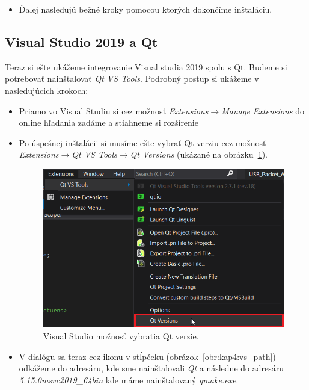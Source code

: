 \begin{itemize}
\item Ďalej nasledujú bežné kroky pomocou ktorých dokončíme inštaláciu.

\end{itemize}

\subsection{Visual Studio 2019 a Qt}
\label{kap4:sec:VS2019_qt}
Teraz si ešte ukážeme integrovanie Visual studia 2019 spolu s Qt. Budeme si potrebovať nainštalovať \textit{Qt VS Tools}. Podrobný postup si ukážeme v nasledujúcich krokoch:
\begin{itemize}
\label{kap4:qt_vs_integ}
\item Priamo vo Visual Studiu si cez možnosť \textit{Extensions}$\rightarrow$\textit{Manage Extensions} do online hľadania zadáme  a stiahneme si rozšírenie ~\cite{qt_vs_tools}
\item\label{kap4:qt_vs_integ:krok2} Po úspešnej inštalácii si musíme ešte vybrať Qt verziu cez možnosť \textit{Extensions}$\rightarrow$\textit{Qt VS Tools}$\rightarrow$\textit{Qt Versions} (ukázané na obrázku~\ref{obr:kap4:vs_versions}).

\begin{figure}[!htb]
	\centering
	\includegraphics[width=12cm]{img/kap04_vs_versions}
	\caption{Visual Studio možnosť vybratia Qt verzie.}
	\label{obr:kap4:vs_versions}
\end{figure}

\item V dialógu sa teraz cez ikonu v stĺpčeku  (obrázok~\ref{obr:kap4:vs_path}) odkážeme do adresáru, kde sme nainštalovali \textit{Qt} a následne do adresáru \textit{5.15.0\/msvc2019\_64\/bin} kde máme nainštalovaný \textit{qmake.exe}.


\end{itemize}
